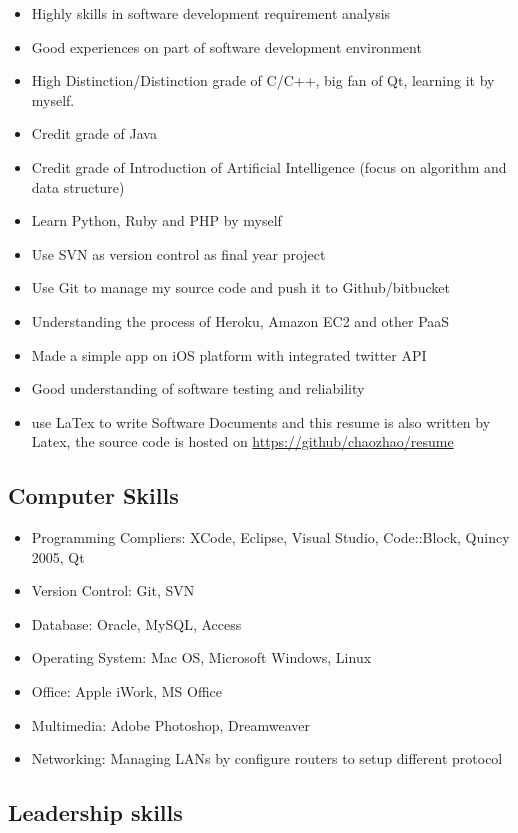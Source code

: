 \documentclass{article}
\begin{document}
	\begin{itemize}
		\item Highly skills in software development requirement analysis
		\item Good experiences on part of software development environment
		\item High Distinction/Distinction grade of C/C++, big fan of Qt, learning it by myself.
		\item Credit grade of Java
		\item Credit grade of Introduction of Artificial Intelligence (focus on algorithm and data structure)
		\item Learn Python, Ruby and PHP by myself
		\item Use SVN as version control as final year project
		\item Use Git to manage my source code and push it to Github/bitbucket
		\item Understanding the process of Heroku, Amazon EC2 and other PaaS
		\item Made a simple app on iOS platform with integrated twitter API
		\item Good understanding of software testing and reliability
		\item use LaTex to write Software Documents and this resume is also written by Latex, the source code is hosted on \url{ https://github/chaozhao/resume}
	\end{itemize}

\subsection*{Computer Skills}
	\begin{itemize}
		\item Programming Compliers: XCode, Eclipse, Visual Studio, Code::Block, Quincy 2005, Qt
		\item Version Control: Git, SVN
		\item Database: Oracle, MySQL, Access
		\item Operating System: Mac OS, Microsoft Windows, Linux
		\item Office: Apple iWork, MS Office
		\item Multimedia: Adobe Photoshop, Dreamweaver
		\item Networking: Managing LANs by configure routers to setup different protocol
	\end{itemize}

\subsection*{Leadership skills}
	
\end{document}

